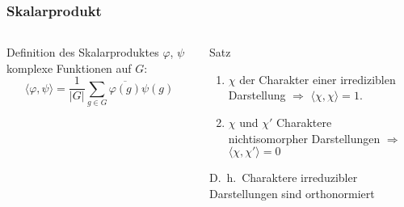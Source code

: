 %
%
%
\bgroup
\begin{frame}[t]
\setlength{\abovedisplayskip}{5pt}
\setlength{\belowdisplayskip}{5pt}
\frametitle{Skalarprodukt}
\vspace{-20pt}
\begin{columns}[t,onlytextwidth]
\begin{column}{0.48\textwidth}
\begin{block}{Definition des Skalarproduktes}
$\varphi$, $\psi$ komplexe Funktionen auf $G$:
\[
\langle \varphi,\psi\rangle
=
\frac{1}{|G|} \sum_{g\in G} \overline{\varphi(g)} \psi(g)
\]
\end{block}
\end{column}
\begin{column}{0.48\textwidth}
\begin{block}{Satz}
\begin{enumerate}
\item
$\chi$ der Charakter einer irrediziblen Darstellung
$\Rightarrow$ $\langle \chi,\chi\rangle=1$.
\item
$\chi$ und $\chi'$ Charaktere nichtisomorpher Darstellungen
$\Rightarrow$
$\langle \chi,\chi'\rangle=0$
\end{enumerate}
D.~h.~Charaktere irreduzibler Darstellungen sind orthonormiert
\end{block}
\end{column}
\end{columns}
\end{frame}
\egroup
